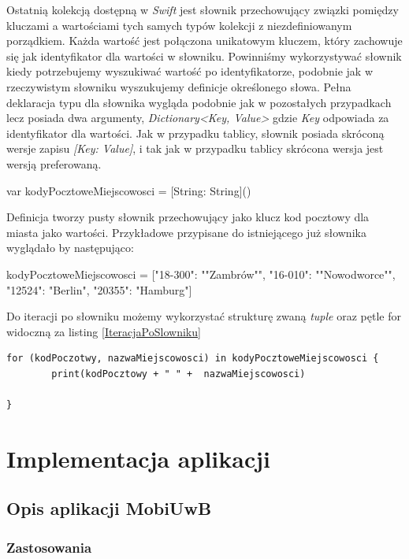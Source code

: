 \documentclass{iiuwb}
\begin{document}
Ostatnią kolekcją dostępną w \textit{Swift} jest słownik przechowujący związki pomiędzy kluczami a wartościami tych samych typów kolekcji z niezdefiniowanym porządkiem. Każda wartość jest połączona unikatowym kluczem, który zachowuje się jak identyfikator dla wartości w słowniku. Powinniśmy wykorzystywać słownik kiedy potrzebujemy wyszukiwać wartość po identyfikatorze, podobnie jak w rzeczywistym słowniku wyszukujemy definicje określonego słowa. Pełna deklaracja typu dla słownika wygląda podobnie jak w pozostałych przypadkach lecz posiada dwa argumenty, \textit{Dictionary<Key, Value>} gdzie \textit{Key} odpowiada za identyfikator dla wartości. Jak w przypadku tablicy, słownik posiada skróconą wersje zapisu \textit{[Key: Value]}, i tak jak w przypadku tablicy skrócona wersja jest wersją preferowaną.
\begin{center}
	var kodyPocztoweMiejscowosci = [String: String]()
\end{center}
Definicja tworzy pusty słownik przechowujący jako klucz kod pocztowy dla miasta jako wartości. Przykładowe przypisane do istniejącego już słownika wyglądało by następująco:  
\begin{center}
	kodyPocztoweMiejscowosci = ["18-300": ""Zambrów"", "16-010": ""Nowodworce"", "12524": "Berlin", "20355": "Hamburg"]
\end{center}
Do iteracji po słowniku możemy wykorzystać strukturę zwaną \textit{tuple} oraz pętle for widoczną za listing \ref{IteracjaPoSlowniku}
\begin{lstlisting}[label=IteracjaPoSlowniku, caption=Iteracja po słowniku z wykorzystaniem \textit{tuple} i pętli for.]
for (kodPoczotwy, nazwaMiejscowosci) in kodyPocztoweMiejscowosci {
		print(kodPocztowy + " " +  nazwaMiejscowosci)
		
}
\end{lstlisting}
\cleardoublepage
\chapter{Implementacja aplikacji}
\label{cha:Implementacja aplikacji}

\section{Opis aplikacji MobiUwB}

\subsection{Zastosowania}
\end{document}
